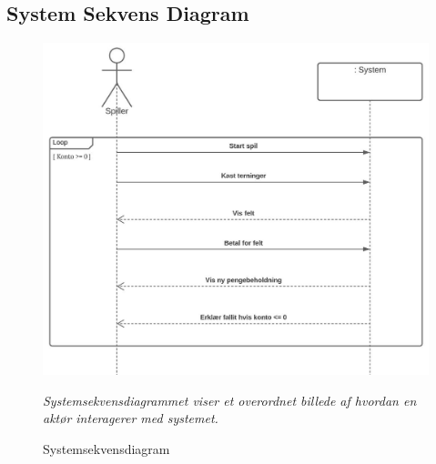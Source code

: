     \subsection{System Sekvens Diagram}
        \begin{figure}[H]
            \centering
            \includegraphics[width=14cm]{figures/overordnetSystemSekvensDiagram.JPG}
            \caption{Systemsekvensdiagram}
            \emph{Systemsekvensdiagrammet viser et overordnet billede af hvordan en aktør interagerer med systemet.}
        \end{figure}
        
    
    
    
